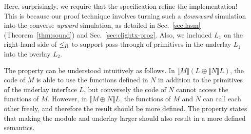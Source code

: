 Here, surprisingly, we require that the specification refine the
implementation!  This is because our proof technique involves turning
such a \emph{downward} simulation into the converse \emph{upward}
simulation, as detailed in Sec.~\ref{sec:lasm}
(Theorem~\ref{thm:sound}) and Sec.~\ref{sec:clightx-prog}.  Also, we
included $L_1$ on the right-hand side of $\le_{R}$ to support
pass-through of primitives in the underlay $L_1$ into the overlay
$L_2$.

The property  can be understood intuitively as
follows.  In $\llbracket M \rrbracket (L \oplus \llbracket N
\rrbracket L)$, the code of $M$ is able to use the functions defined
in $N$ in addition to the primitives of the underlay interface $L$,
but conversely the code of $N$ cannot access the functions of $M$.
However, in $\llbracket M \oplus N \rrbracket L$, the functions of $M$
and $N$ can call each other freely, and therefore the result should be
more defined.  The property  states that making the
module and underlay larger should also result in a more defined
semantics.

